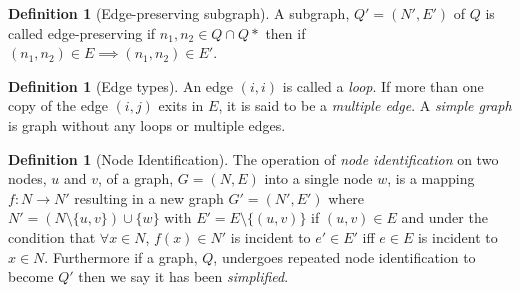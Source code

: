 \documentclass[a4paper,10pt]{article}
\theoremstyle{definition}
\newtheorem{definition}[theorem]{Definition}
\theoremstyle{definition}
\theoremstyle{remark}
\theoremstyle{definition}
\begin{document}
\begin{myfigure}
\begin{center}
\begin{submyfigure}{.3\textwidth}
\begin{center}
\end{center}
\caption{$Q_{1}$}
\label{subexamplefigure: induced subgraph}
\end{submyfigure}
\caption{ $Q_{1}$ is a subgraph of $Q$. However it is not induced as it is missing possible edges connecting nodes that existed in $Q$. $Q_{2}$ shows the induced subgraph on the chosen set of nodes. }
\end{center}
\label{examplefigure: subgraph example}
\end{myfigure}

\begin{definition}[Edge-preserving subgraph]
A subgraph, $Q'=(N',E')$ of $Q$ is called edge-preserving if $n_{1},n_{2} \in Q \cap Q*$ then if $(n_{1},n_{2}) \in E \implies (n_{1},n_{2}) \in E'$. 
\end{definition}

\begin{definition}[Edge types]
An edge $(i,i)$ is called a \textit{loop}. If more than one copy of the edge $(i,j)$ exits in $E$, it is said to be a \textit{multiple edge}. A \textit{simple graph} is graph without any loops or multiple edges.
\end{definition}

\begin{definition}[Node Identification]
The operation of \textit{node identification} on two nodes, $u$ and $v$, of a graph, $G=(N,E)$ into a single node $w$, is a mapping $f:N \rightarrow N'$ resulting in a new graph $G'=(N',E')$ where $N'=(N \setminus  \{u,v\}) \cup \{w\}$ with $E'=E \setminus \{(u,v)\}$ if $(u,v) \in E$ and under the condition that $\forall x \in N$, $f(x) \in N'$ is incident to $e' \in E'$ iff $e \in E$ is incident to $x \in N$.
Furthermore if a graph, $Q$, undergoes repeated node identification to become $Q'$ then we say it has been \textit{simplified}. 
\end{definition}
\end{document}
